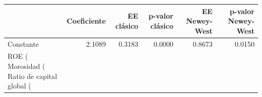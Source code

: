 \begin{tabular}{lrrrrr}
\toprule
 & Coeficiente & EE clásico & p-valor clásico & EE Newey-West & p-valor Newey-West \\
\midrule
Constante & 2.1089 & 0.3183 & 0.0000 & 0.8673 & 0.0150 \\
ROE (%
Morosidad (%
Ratio de capital global (%
\bottomrule
\end{tabular}

